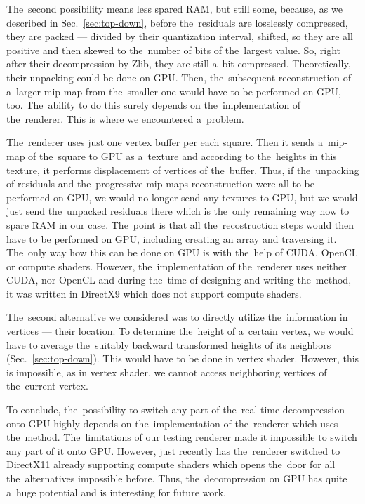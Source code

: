 The~second possibility means less spared RAM, but still some, because, as we described in Sec.~\ref{sec:top-down}, before the~residuals are losslessly compressed, they are packed --- divided by their quantization interval, shifted, so they are all positive and then skewed to the~number of bits of the~largest value. So, right after their decompression by Zlib, they are still a~bit compressed. Theoretically, their unpacking could be done on GPU. Then, the~subsequent reconstruction of a~larger mip-map from the~smaller one would have to be performed on GPU, too. The~ability to do this surely depends on the~implementation of the~renderer. This is where we encountered a~problem.

The~renderer uses just one vertex buffer per each square. Then it sends a~mip-map of the~square to GPU as a~texture and according to the~heights in this texture, it performs displacement of vertices of the~buffer. Thus, if the~unpacking of residuals and the~progressive mip-maps reconstruction were all to be performed on GPU, we would no longer send any textures to GPU, but we would just send the~unpacked residuals there which is the~only remaining way how to spare RAM in our case. The~point is that all the~recostruction steps would then have to be performed on GPU, including creating an array and traversing it. The~only way how this can be done on GPU is with the~help of CUDA, OpenCL or compute shaders. However, the~implementation of the~renderer uses neither CUDA, nor OpenCL and during the~time of designing and writing the~method, it was written in DirectX9 which does not support compute shaders.  

The~second alternative we considered was to directly utilize the~information in vertices --- their location. To determine the~height of a~certain vertex, we would have to average the~suitably backward transformed heights of its neighbors (Sec.~\ref{sec:top-down}). This would have to be done in vertex shader. However, this is impossible, as in vertex shader, we cannot access neighboring vertices of the~current vertex.

To conclude, the~possibility to switch any part of the~real-time decompression onto GPU highly depends on the~implementation of the~renderer which uses the~method. The~limitations of our testing renderer made it impossible to switch any part of it onto GPU. However, just recently has the~renderer switched to DirectX11 already supporting compute shaders which opens the~door for all the~alternatives impossible before. Thus, the~decompression on GPU has quite a~huge potential and is interesting for future work. 